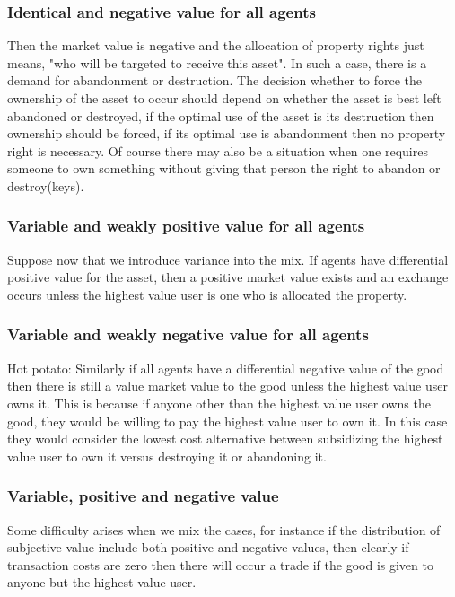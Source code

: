 \documentclass[12pt]{article}
\numberwithin{equation}{section}
\begin{document}
\subsubsection{Identical and negative value for all agents}

Then the market value is negative and the allocation of property rights just means,  "who will be targeted to receive this asset". In such a case, there is a demand for abandonment or destruction. The decision whether to force the ownership of the asset to occur should depend on whether the asset is best left abandoned or destroyed, if the optimal use of the asset is its destruction then ownership should be forced, if its optimal use is abandonment then no property right is necessary. Of course there may also be a situation when one requires someone to own something without giving that person the right to abandon or destroy(keys). 

\subsubsection{Variable and weakly positive value for all agents}

Suppose now that we introduce variance into the mix. If agents have differential positive value for the asset, then a positive market value exists and an exchange occurs unless the highest value user is one who is allocated the property.

\subsubsection{Variable and weakly negative value for all agents}

Hot potato: Similarly if all agents have a differential negative value of the good then there is still a value market value to the good unless the highest value user owns it. This is because if anyone other than the highest value user owns the good, they would be willing to pay the highest value user to own it. In this case they would consider the lowest cost alternative between subsidizing the highest value user to own it versus destroying it or abandoning it. 

\subsubsection{Variable, positive and negative value}

Some difficulty arises when we mix the cases, for instance if the distribution of subjective value include both positive and negative values, then clearly if transaction costs are zero then there will occur a trade if the good is given to anyone but the highest value user. 
\end{document}
